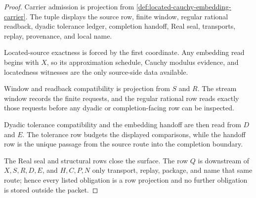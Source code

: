 \begin{proof}
Carrier admission is projection from \autoref{def:located-cauchy-embedding-carrier}. The tuple displays the source row, finite window, regular rational readback, dyadic tolerance ledger, completion handoff, Real seal, transports, replay, provenance, and local name.

Located-source exactness is forced by the first coordinate. Any embedding read begins with $X$, so its approximation schedule, Cauchy modulus evidence, and locatedness witnesses are the only source-side data available.

Window and readback compatibility is projection from $S$ and $R$. The stream window records the finite requests, and the regular rational row reads exactly those requests before any dyadic or completion-facing row can be inspected.

Dyadic tolerance compatibility and the embedding handoff are then read from $D$ and $E$. The tolerance row budgets the displayed comparisons, while the handoff row is the unique passage from the source route into the completion boundary.

The Real seal and structural rows close the surface. The row $Q$ is downstream of $X,S,R,D,E$, and $H,C,P,N$ only transport, replay, package, and name that same route; hence every listed obligation is a row projection and no further obligation is stored outside the packet.
\end{proof}

